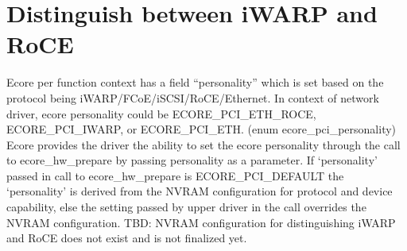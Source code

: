 \documentclass[11pt,fleqn,hidelinks,oneside]{book} %
\begin{document}
\section{Distinguish between iWARP and RoCE}
Ecore per function context has a field “personality” which is set based on the protocol being iWARP/FCoE/iSCSI/RoCE/Ethernet. In context of network driver, ecore personality could be ECORE\_PCI\_ETH\_ROCE, ECORE\_PCI\_IWARP, or ECORE\_PCI\_ETH. (enum ecore\_pci\_personality)
Ecore provides the driver the ability to set the ecore personality through the call to ecore\_hw\_prepare by passing personality as a parameter. If ‘personality’ passed in call to ecore\_hw\_prepare is ECORE\_PCI\_DEFAULT the ‘personality’ is derived from the NVRAM configuration for protocol and device capability, else the setting passed by upper driver in the call overrides the NVRAM configuration.
TBD: NVRAM configuration for distinguishing iWARP and RoCE does not exist and is not finalized yet.
\end{document}
